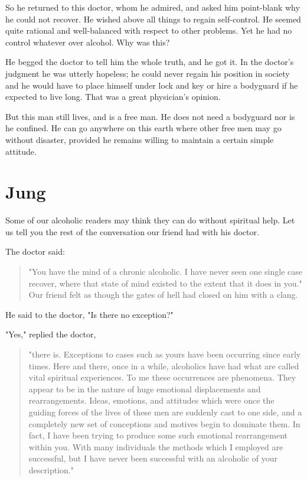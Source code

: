 So he returned to this doctor, whom he admired, 
and asked him point-blank why he could not recover. 
He wished above all things to regain self-control. 
He seemed quite rational and well-balanced with respect to other problems. 
Yet he had no control whatever over alcohol. 
Why was this?

He begged the doctor to tell him the whole truth, and he got it. 
In the doctor's judgment he was utterly hopeless; 
he could never regain his position in society 
and he would have to place himself under lock and key or hire a bodyguard if he expected to live long. 
That was a great physician's opinion.

But this man still lives, and is a free man. 
He does not need a bodyguard nor is he confined. 
He can go anywhere on this earth where other free men may go without disaster, 
provided he remains willing to maintain a certain simple attitude.


\section{Jung}

Some of our alcoholic readers may think they can do without spiritual help. 
Let us tell you the rest of the conversation our friend had with his doctor.

The doctor said: 
\begin{quote}
    "You have the mind of a chronic alcoholic. 
    I have never seen one single case recover, 
    where that state of mind existed to the extent that it does in you." 
    Our friend felt as though the gates of hell had closed on him with a clang.
\end{quote}

He said to the doctor, "Is there no exception?"

"Yes," replied the doctor, 
\begin{quote}
    "there is. 
    Exceptions to cases such as yours have been occurring since early times. 
    Here and there, once in a while, alcoholics have had what are called vital spiritual experiences. 
    To me these occurrences are phenomena. 
    They appear to be in the nature of huge emotional displacements and rearrangements. 
    Ideas, emotions, and attitudes which were once the guiding forces of the lives of these men are suddenly cast to one side, 
    and a completely new set of conceptions and motives begin to dominate them. 
    In fact, I have been trying to produce some such emotional rearrangement within you. 
    With many individuals the methods which I employed are successful, 
    but I have never been successful with an alcoholic of your description."
\end{quote}

